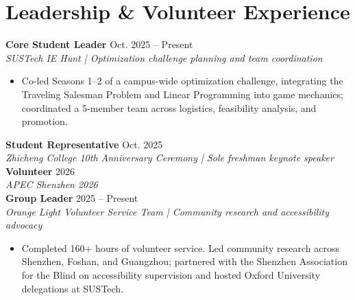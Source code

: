 \documentclass[10pt,a4paper]{article}
\begin{document}
\section{Leadership \& Volunteer Experience}
\textbf{Core Student Leader} \hfill Oct. 2025 -- Present\\
\textit{SUSTech IE Hunt | Optimization challenge planning and team coordination}
\begin{itemize}
    \item Co-led Seasons 1--2 of a campus-wide optimization challenge, integrating the Traveling Salesman Problem and Linear Programming into game mechanics; coordinated a 5-member team across logistics, feasibility analysis, and promotion.
\end{itemize}
\textbf{Student Representative} \hfill Oct. 2025\\
\textit{Zhicheng College 10th Anniversary Ceremony | Sole freshman keynote speaker}\\
\textbf{Volunteer} \hfill 2026\\
\textit{APEC Shenzhen 2026}\\
\textbf{Group Leader} \hfill 2025 -- Present\\
\textit{Orange Light Volunteer Service Team | Community research and accessibility advocacy}
\begin{itemize}
    \item Completed 160+ hours of volunteer service. Led community research across Shenzhen, Foshan, and Guangzhou; partnered with the Shenzhen Association for the Blind on accessibility supervision and hosted Oxford University delegations at SUSTech.
\end{itemize}
\end{document}
